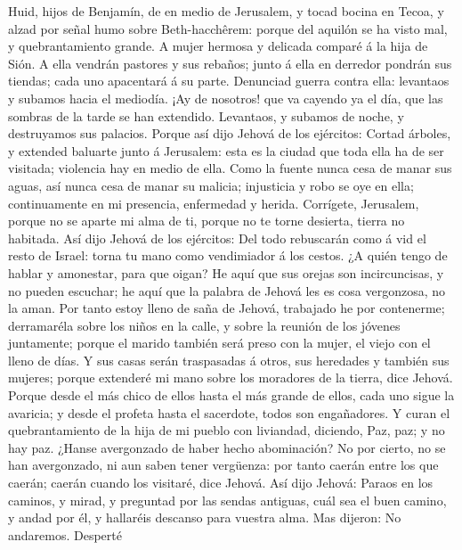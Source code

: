  Huid, hijos de Benjamín, de en medio de Jerusalem, y
tocad bocina en Tecoa, y alzad por señal humo sobre Beth-hacchêrem:
porque del aquilón se ha visto mal, y quebrantamiento grande.
 A mujer hermosa y delicada comparé á la hija de Sión.
 A ella vendrán pastores y sus rebaños; junto á ella en
derredor pondrán sus tiendas; cada uno apacentará á su parte.
 Denunciad guerra contra ella: levantaos y subamos hacia
el mediodía. ¡Ay de nosotros! que va cayendo ya el día, que las sombras
de la tarde se han extendido.  Levantaos, y subamos de
noche, y destruyamos sus palacios.  Porque así dijo Jehová
de los ejércitos: Cortad árboles, y extended baluarte junto á Jerusalem:
esta es la ciudad que toda ella ha de ser visitada; violencia hay en
medio de ella.  Como la fuente nunca cesa de manar sus
aguas, así nunca cesa de manar su malicia; injusticia y robo se oye en
ella; continuamente en mi presencia, enfermedad y herida. 
Corrígete, Jerusalem, porque no se aparte mi alma de ti, porque no te
torne desierta, tierra no habitada.  Así dijo Jehová de
los ejércitos: Del todo rebuscarán como á vid el resto de Israel: torna
tu mano como vendimiador á los cestos.  ¿A quién tengo de
hablar y amonestar, para que oigan? He aquí que sus orejas son
incircuncisas, y no pueden escuchar; he aquí que la palabra de Jehová
les es cosa vergonzosa, no la aman.  Por tanto estoy
lleno de saña de Jehová, trabajado he por contenerme; derramaréla sobre
los niños en la calle, y sobre la reunión de los jóvenes juntamente;
porque el marido también será preso con la mujer, el viejo con el lleno
de días.  Y sus casas serán traspasadas á otros, sus
heredades y también sus mujeres; porque extenderé mi mano sobre los
moradores de la tierra, dice Jehová.  Porque desde el más
chico de ellos hasta el más grande de ellos, cada uno sigue la avaricia;
y desde el profeta hasta el sacerdote, todos son engañadores.
 Y curan el quebrantamiento de la hija de mi pueblo con
liviandad, diciendo, Paz, paz; y no hay paz.  ¿Hanse
avergonzado de haber hecho abominación? No por cierto, no se han
avergonzado, ni aun saben tener vergüenza: por tanto caerán entre los
que caerán; caerán cuando los visitaré, dice Jehová.  Así
dijo Jehová: Paraos en los caminos, y mirad, y preguntad por las sendas
antiguas, cuál sea el buen camino, y andad por él, y hallaréis descanso
para vuestra alma. Mas dijeron: No andaremos.  Desperté
